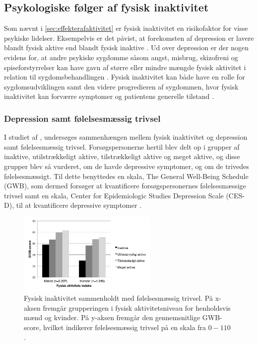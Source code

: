 \subsection{Psykologiske følger af fysisk inaktivitet}
Som nævnt i \autoref{sec:effekterafaktivitet} er fysisk inaktivitet en risikofaktor for visse psykiske lidelser. Eksempelvis er det påvist, at forekomsten af depression er lavere blandt fysisk aktive end blandt fysisk inaktive \citep{motionsraad2007}. Ud over depression er der nogen evidens for, at andre psykiske sygdomme såsom angst, misbrug, skizofreni og spiseforstyrrelser kan have gavn af større eller mindre mængde fysisk aktivitet i relation til sygdomsbehandlingen \citep{kessing2016}. Fysisk inaktivitet kan både have en rolle for sygdomsudviklingen samt den videre progredieren af sygdommen, hvor fysisk inaktivitet kan forværre symptomer og patientens generelle tilstand \citep{motionsraad2007,kessing2016}.

\subsubsection{Depression samt følelsesmæssig trivsel}
I studiet  af \citeauthor{galper2006}, undersøges sammenhængen mellem fysisk inaktivitet og depression samt følelsesmæssig trivsel. Forsøgspersonerne hertil blev delt op i grupper af inaktive, utilstrækkeligt aktive, tilstrækkeligt aktive og meget aktive, og disse grupper blev så vurderet, om de havde depressive symptomer, og om de trivedes følelsesmæssigt. 
Til dette benyttedes en skala, The General Well-Being Schedule (GWB), som dermed forsøger at kvantificere forsøgspersonernes følelsesmæssige trivsel samt en skala, Center for Epidemiologic Studies Depression Scale (CES-D), til at kvantificere depressive symptomer \citep{galper2006}.

\begin{figure}[H]
\centering
\includegraphics[width=0.6\textwidth]{figures/inaktivitet_gwb}
\caption{Fysisk inaktivitet sammenholdt med følelsesmæssig trivsel. På x-aksen fremgår grupperingen i fysisk aktivitetsniveau for henholdsvis mænd og kvinder. På y-aksen fremgår den gennemsnitlige GWB-score, hvilket indikerer følelsesmæssig trivsel på en skala fra $0-110$ \citep{galper2006}.}
\label{fig:inaktivitet_gwb}
\end{figure}

